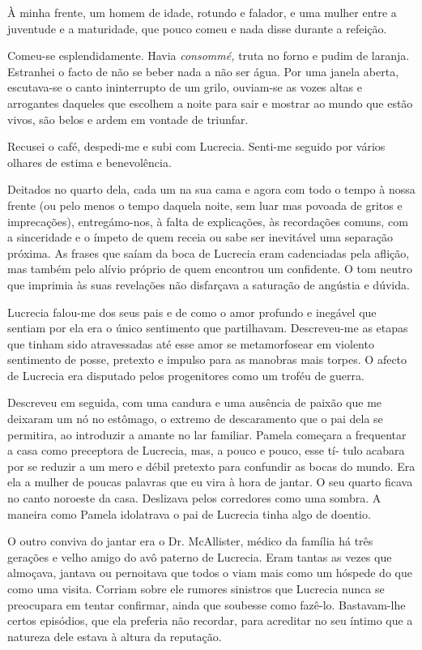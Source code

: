 À minha frente, um homem de idade, rotundo e falador, e uma mulher entre
a juventude e a maturidade, que pouco comeu e nada disse durante a
refeição.

Comeu-se esplendidamente. Havia \emph{consommé, }truta no forno e pudim
de laranja. Estranhei o facto de não se beber nada a não ser água. Por
uma janela aberta, escutava-se o canto ininterrupto de um grilo,
ouviam-se as vozes altas e arrogantes daqueles que escolhem a noite para
sair e mostrar ao mundo que estão vivos, são belos e ardem em vontade de
triunfar.

Recusei o café, despedi-me e subi com Lucrecia. Senti-me seguido por
vários olhares de estima e benevolência.

Deitados no quarto dela, cada um na sua cama e agora com todo o tempo à
nossa frente (ou pelo menos o tempo daquela noite, sem luar mas povoada
de gritos e imprecações), entregámo-nos, à falta de explicações, às
recordações comuns, com a sinceridade e o ímpeto de quem receia ou sabe
ser inevitável uma separação próxima. As frases que saíam da boca de
Lucrecia eram cadenciadas pela aflição, mas também pelo alívio próprio
de quem encontrou um confidente. O tom neutro que imprimia às suas
revelações não disfarçava a saturação de angústia e dúvida.

Lucrecia falou-me dos seus pais e de como o amor profundo e inegável
que sentiam por ela era o único sentimento que partilhavam. Descreveu-me
as etapas que tinham sido atravessadas até esse amor se metamorfosear
em violento sentimento de posse, pretexto e impulso para as manobras
mais torpes. O afecto de Lucrecia era disputado pelos progenitores como
um troféu de guerra.

Descreveu em seguida, com uma candura e uma ausência de paixão que me
deixaram um nó no estômago, o extremo de descaramento que o pai dela se
permitira, ao introduzir a amante no lar familiar. Pamela começara a
frequentar a casa como preceptora de Lucrecia, mas, a pouco e pouco,
esse tí- tulo acabara por se reduzir a um mero e débil pretexto para
confundir as bocas do mundo. Era ela a mulher de poucas palavras que eu
vira à hora de jantar. O seu quarto ficava no canto noroeste da casa.
Deslizava pelos corredores como uma sombra. A maneira como Pamela
idolatrava o pai de Lucrecia tinha algo de doentio.

O outro conviva do jantar era o Dr. McAllister, médico da família há
três gerações e velho amigo do avô paterno de Lucrecia. Eram tantas as
vezes que almoçava, jantava ou pernoitava que todos o viam mais como um hóspede do que como uma visita.
Corriam sobre ele rumores sinistros que Lucrecia nunca se preocupara em
tentar confirmar, ainda que soubesse como fazê-lo. Bastavam-lhe certos
episódios, que ela preferia não recordar, para acreditar no seu íntimo
que a natureza dele estava à altura da reputação.

